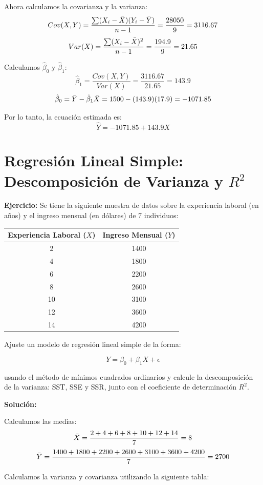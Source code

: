 \documentclass[10pt,a4paper]{article}
\begin{document}
Ahora calculamos la covarianza y la varianza:
$$Cov(X,Y) = \frac{\sum (X_i - \Bar{X})(Y_i - \Bar{Y})}{n-1}= \frac{28050}{9} = 3116.67$$
$$Var(X) = \frac{\sum (X_i-\Bar{X})^2}{n-1} = \frac{194.9}{9} = 21.65$$

Calculamos $\hat{\beta}_0$ y $\hat{\beta}_1$:
$$\hat{\beta}_1 = \frac{Cov(X,Y)}{Var(X)} = \frac{3116.67}{21.65} = 143.9$$
$$\hat{\beta}_0 = \Bar{Y} - \hat{\beta}_1 \Bar{X} = 1500-(143.9)(17.9) = -1071.85$$

Por lo tanto, la ecuación estimada es:
$$\hat{Y} = -1071.85 + 143.9 X$$

\section{Regresión Lineal Simple: Descomposición de Varianza y $R^2$}

\textbf{Ejercicio:} Se tiene la siguiente muestra de datos sobre la experiencia laboral (en años) y el ingreso mensual (en dólares) de 7 individuos:

\begin{center}
\begin{tabular}{|c|c|}
\hline
Experiencia Laboral ($X$) & Ingreso Mensual ($Y$) \\
\hline
2   & 1400  \\
\hline
4   & 1800  \\
\hline
6   & 2200  \\
\hline
8   & 2600  \\
\hline
10  & 3100  \\
\hline
12  & 3600  \\
\hline
14  & 4200  \\
\hline
\end{tabular}
\end{center}

Ajuste un modelo de regresión lineal simple de la forma:

$$Y = \beta_0 + \beta_1 X + \epsilon $$

usando el método de mínimos cuadrados ordinarios y calcule la descomposición de la varianza: SST, SSE y SSR, junto con el coeficiente de determinación $R^2$.

\textbf{Solución:}

Calculamos las medias:
$$\Bar{X} = \frac{2+4+6+8+10+12+14}{7}=8$$
$$\Bar{Y} = \frac{1400+1800+2200+2600+3100+3600+4200}{7} = 2700$$

Calculamos la varianza y covarianza utilizando la siguiente tabla:
\end{document}
